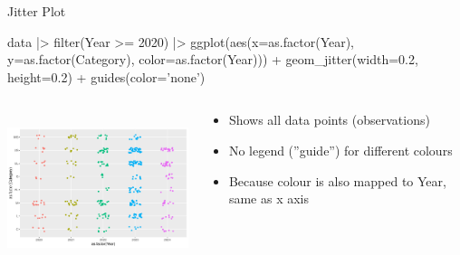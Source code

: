 \documentclass[ignorenonframetext,xcolor=x11names]{beamer}
\begin{document}
\begin{frame}[fragile]{Jitter Plot}
\begin{Rcode}
data |> 
  filter(Year >= 2020) |>
  ggplot(aes(x=as.factor(Year), y=as.factor(Category), 
             color=as.factor(Year))) +
    geom_jitter(width=0.2, height=0.2) +
    guides(color='none')
\end{Rcode}
\begin{columns}
\begin{column}{.70\textwidth}
  \includegraphics[height=1.75in]{fuel.jitterdiscrete.pdf}
\end{column}
\begin{column}{.35\textwidth}
\footnotesize
\begin{itemize}
   \item Shows all data points (observations)
   \item No legend (''guide'') for different colours
   \item Because colour is also mapped to Year, same as x axis
\end{itemize}
\end{column}
\end{columns}
\end{frame}
\end{document}
